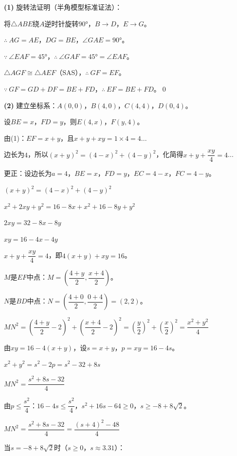 \documentclass[12pt, a4paper]{ctexart}
\begin{document}
\begin{proofbox}[【题8】详解]
\textbf{(1)} 旋转法证明（半角模型标准证法）：

将$\triangle ABE$绕$A$逆时针旋转$90°$，$B \to D$，$E \to G$。

$\therefore\ AG = AE$，$DG = BE$，$\angle GAE = 90°$。

$\because\ \angle EAF = 45°$，$\therefore\ \angle GAF = 45° = \angle EAF$。

$\triangle AGF \cong \triangle AEF$（SAS），$\therefore\ GF = EF$。

$\because\ GF = GD + DF = BE + FD$，$\therefore\ EF = BE + FD$。\qed

\textbf{(2)} 建立坐标系：$A(0,0)$，$B(4,0)$，$C(4,4)$，$D(0,4)$。

设$BE = x$，$FD = y$，则$E(4, x)$，$F(y, 4)$。

由(1)：$EF = x + y$，且$x + y + xy = 1 \times 4 = 4$...

边长为$4$，所以$(x+y)^2 = (4-x)^2 + (4-y)^2$，化简得$x + y + \dfrac{xy}{4} = 4$...

更正：设边长为$a=4$，$BE=x$，$FD=y$，$EC=4-x$，$FC=4-y$。

$(x+y)^2 = (4-x)^2 + (4-y)^2$

$x^2+2xy+y^2 = 16-8x+x^2+16-8y+y^2$

$2xy = 32-8x-8y$

$xy = 16-4x-4y$

$x+y+\dfrac{xy}{4} = 4$，即$4(x+y)+xy = 16$。

$M$是$EF$中点：$M = \left(\dfrac{4+y}{2}, \dfrac{x+4}{2}\right)$。

$N$是$BD$中点：$N = \left(\dfrac{4+0}{2}, \dfrac{0+4}{2}\right) = (2, 2)$。

$MN^2 = \left(\dfrac{4+y}{2} - 2\right)^2 + \left(\dfrac{x+4}{2} - 2\right)^2 = \left(\dfrac{y}{2}\right)^2 + \left(\dfrac{x}{2}\right)^2 = \dfrac{x^2+y^2}{4}$

由$xy = 16-4(x+y)$，设$s = x+y$，$p = xy = 16-4s$。

$x^2+y^2 = s^2 - 2p = s^2 - 32 + 8s$

$MN^2 = \dfrac{s^2 + 8s - 32}{4}$

由$p \leqslant \dfrac{s^2}{4}$：$16-4s \leqslant \dfrac{s^2}{4}$，$s^2+16s-64 \geqslant 0$，$s \geqslant -8+8\sqrt{2}$。

$MN^2 = \dfrac{s^2+8s-32}{4} = \dfrac{(s+4)^2-48}{4}$

当$s = -8+8\sqrt{2}$时（$s \geqslant 0$，$s \approx 3.31$）：


\end{proofbox}
\end{document}
